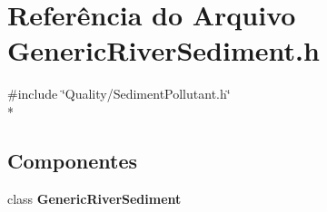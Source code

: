 \section{Referência do Arquivo Generic\+River\+Sediment.\+h}
\label{_generic_river_sediment_8h}
{\ttfamily \#include \char`\"{}Quality/\+Sediment\+Pollutant.\+h\char`\"{}}\\*
\subsection*{Componentes}
\begin{DoxyCompactItemize}
\item 
class {\bf Generic\+River\+Sediment}
\end{DoxyCompactItemize}
